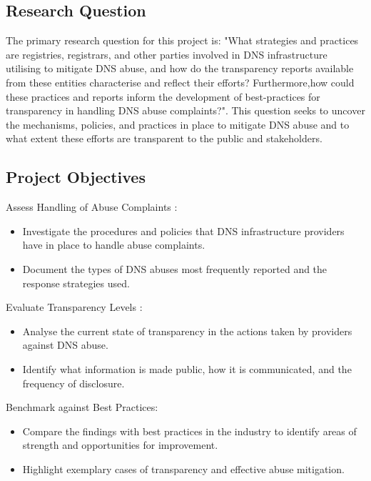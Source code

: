 \subsection{Research Question}

The primary research question for this project is: "What strategies and practices are registries, registrars, and other parties involved in DNS infrastructure utilising to mitigate DNS abuse, and how do the transparency reports available from these entities characterise and reflect their efforts? Furthermore,how could these practices and reports inform the development of best-practices for transparency in handling DNS abuse complaints?". This question seeks to uncover the mechanisms, policies, and practices in place to mitigate DNS abuse and to what extent these efforts are transparent to the public and stakeholders.

\subsection{Project Objectives}

Assess Handling of Abuse Complaints :

\begin{itemize}
  \item Investigate the procedures and policies that DNS infrastructure providers have in place to handle abuse complaints.
  \item Document the types of DNS abuses most frequently reported and the response strategies used.
\end{itemize}

Evaluate Transparency Levels :

\begin{itemize}
  \item Analyse the current state of transparency in the actions taken by providers against DNS abuse.
  \item Identify what information is made public, how it is communicated, and the frequency of disclosure.
\end{itemize}

Benchmark against Best Practices:

\begin{itemize}
  \item Compare the findings with best practices in the industry to identify areas of strength and opportunities for improvement.
  \item Highlight exemplary cases of transparency and effective abuse mitigation.
\end{itemize}

